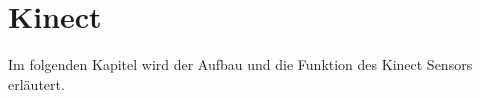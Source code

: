 \chapter{Kinect}      %
Im folgenden Kapitel wird der Aufbau und die Funktion des Kinect Sensors erläutert.
\done{}



